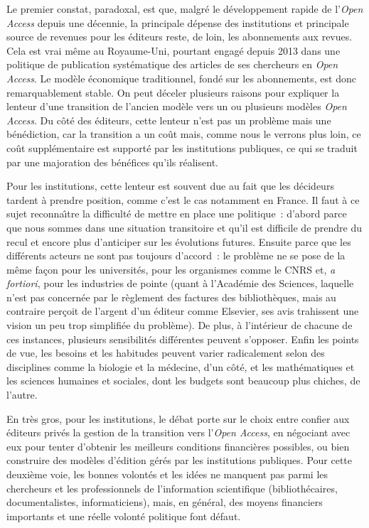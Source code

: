 Le premier constat, paradoxal, est que, malgr{\'e} le d{\'e}veloppement rapide de l'\emph{Open Access} depuis une d{\'e}cennie, la principale d{\'e}pense des institutions et
principale source de revenues pour les {\'e}diteurs reste, de loin, les abonnements aux revues. Cela est vrai m{\^e}me au Royaume-Uni, pourtant engag{\'e} depuis
2013 dans une politique de publication syst{\'e}matique des articles de ses chercheurs en \emph{Open Access}. Le mod{\`e}le {\'e}conomique traditionnel, fond{\'e} sur les abonnements,
est donc remarquablement stable. On peut d{\'e}celer plusieurs raisons pour expliquer la lenteur d'une transition de l'ancien mod{\`e}le vers un ou plusieurs
mod{\`e}les \emph{Open Access}. Du c{\^o}t{\'e} des {\'e}diteurs, cette lenteur n'est pas un probl{\`e}me mais une b{\'e}n{\'e}diction, car la transition a un co{\^u}t mais, comme nous le
verrons plus loin, ce co{\^u}t suppl{\'e}mentaire est support{\'e} par les institutions publiques, ce qui se traduit par une majoration des b{\'e}n{\'e}fices qu'ils r{\'e}alisent.

Pour les institutions, cette lenteur est souvent due au fait que les d{\'e}cideurs tardent {\`a} prendre position, comme c'est le cas notamment en France.
Il faut {\`a} ce sujet reconna{\^\i}tre la difficult{\'e} de mettre en place une politique~: d'abord parce que nous sommes dans une situation transitoire et qu'il
est difficile de prendre du recul et encore plus d'anticiper sur les {\'e}volutions futures. Ensuite parce que les diff{\'e}rents acteurs ne sont pas toujours
d'accord~: le probl{\`e}me ne se pose de la m{\^e}me fa{\c c}on pour les universit{\'e}s, pour les organismes comme le CNRS et, \emph{a fortiori}, pour les industries de pointe
(quant {\`a} l'Acad{\'e}mie des Sciences, laquelle n'est pas concern{\'e}e par le r{\`e}glement des factures des biblioth{\`e}ques, mais au contraire per{\c c}oit de l'argent
d'un {\'e}diteur comme Elsevier, ses avis trahissent une vision un peu trop simplifi{\'e}e du probl{\`e}me). De plus, {\`a} l'int{\'e}rieur de chacune de ces instances,
plusieurs sensibilit{\'e}s diff{\'e}rentes peuvent s'opposer. Enfin les points de vue, les besoins et les habitudes peuvent varier radicalement selon des
disciplines comme la biologie et la m{\'e}decine, d'un c{\^o}t{\'e}, et les math{\'e}matiques et les sciences humaines et sociales, dont les budgets sont beaucoup
plus chiches, de l'autre.

En tr{\`e}s gros, pour les institutions, le d{\'e}bat porte sur le choix entre confier aux {\'e}diteurs priv{\'e}s la gestion de la transition vers l'\emph{Open Access},
en n{\'e}gociant avec eux pour tenter d'obtenir les meilleurs conditions financi{\`e}res possibles, ou bien construire des mod{\`e}les d'{\'e}dition g{\'e}r{\'e}s par les
institutions publiques. Pour cette deuxi{\`e}me voie, les bonnes volont{\'e}s et les id{\'e}es ne manquent pas parmi les chercheurs et les professionnels de
l'information scientifique (biblioth{\'e}caires, documentalistes, informaticiens), mais, en g{\'e}n{\'e}ral, des moyens financiers importants et une r{\'e}elle
volont{\'e} politique font d{\'e}faut.


